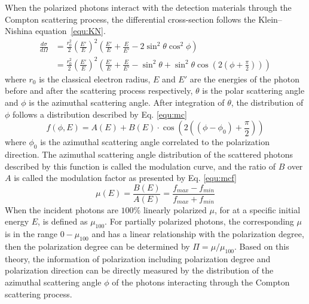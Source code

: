 \documentclass[preprint,sort&compress,12pt]{elsarticle}
\begin{document}
When the polarized photons interact with the detection materials through the Compton scattering process, the differential cross-section follows the Klein--Nishina equation~\eqref{equ:KN}.
\begin{equation}\label{equ:KN}
\begin{aligned}
\frac{d\sigma}{d\Omega} & =\frac{r_0^2}{2}\left(\frac{E'}{E}\right)^2\left(\frac{E'}{E}+\frac{E}{E'}-2\sin^2\theta\cos^2\phi\right) \\
& = \frac{r_0^2}{2}\left(\frac{E'}{E}\right)^2\left(\frac{E'}{E}+\frac{E}{E'}-\sin^2\theta+\sin^2\theta\cos\left(2\left(\phi+\frac{\pi}{2}\right)\right)\right)
\end{aligned}
\end{equation}
where $r_0$ is the classical electron radius, $E$ and $E'$ are the energies of the photon before and after the scattering process respectively, $\theta$ is the polar scattering angle and $\phi$ is the azimuthal scattering angle. After integration of $\theta$, the distribution of $\phi$ follows a distribution described by Eq. \eqref{equ:mc}
\begin{equation}\label{equ:mc}
f(\phi,E) = A(E)+B(E)\cdot\cos\left(2\left((\phi-\phi_0)+\frac{\pi}{2}\right)\right)
\end{equation}
where $\phi_0$ is the azimuthal scattering angle correlated to the polarization direction. The azimuthal scattering angle distribution of the scattered photons described by this function is called the modulation curve, and the ratio of $B$ over $A$ is called the modulation factor as presented by Eq. \eqref{equ:mcf} 
\begin{equation}\label{equ:mcf}
\mu(E) = \frac{B(E)}{A(E)}=\frac{f_{max}-f_{min}}{f_{max}+f_{min}}
\end{equation}
When the incident photons are $100\%$ linearly polarized $\mu$, for at a specific initial energy $E$, is defined as $\mu_{100}$. For partially polarized photons, the corresponding $\mu$ is in the range $0 - \mu_{100}$ and has a linear relationship with the polarization degree, then the polarization degree can be determined by $\Pi=\mu/\mu_{100}$. Based on this theory, the information of polarization including polarization degree and polarization direction can be directly measured by the distribution of the azimuthal scattering angle $\phi$ of the photons interacting through the Compton scattering process.
\end{document}
